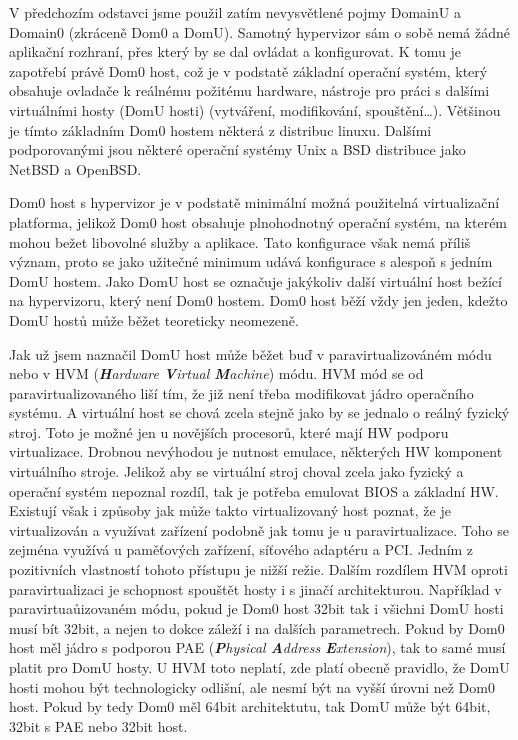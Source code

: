 V předchozím odstavci jsme použil zatím nevysvětlené pojmy DomainU a Domain0 (zkráceně Dom0 a DomU). Samotný \xen hypervizor sám o sobě nemá žádné aplikační rozhraní, přes který by se dal ovládat a konfigurovat. K tomu je zapotřebí právě Dom0 host, což je v podstatě základní operační systém, který obsahuje ovladače k reálnému požitému hardware, nástroje pro práci s dalšími virtuálními hosty (DomU hosti) (vytváření, modifikování, spouštění\dots). Většinou je tímto základním Dom0 hostem některá z distribuc linuxu. Dalšími podporovanými jsou některé operační systémy Unix a BSD distribuce jako NetBSD a OpenBSD.

Dom0 host s \xen hypervizor je v podstatě minimální možná použitelná virtualizační platforma, jelikož Dom0 host obsahuje plnohodnotný operační systém, na kterém mohou bežet libovolné služby a aplikace. Tato konfigurace však nemá příliš význam, proto se jako užitečné minimum udává konfigurace s alespoň s jedním DomU hostem. Jako DomU host se označuje jakýkoliv další virtuální host bežící na \xen hypervizoru, který není Dom0 hostem. Dom0 host běží vždy jen jeden, kdežto DomU hostů může běžet teoreticky neomezeně.

Jak už jsem naznačil DomU host může běžet buď v paravirtualizováném módu nebo v HVM (\emph{\textbf{H}ardware \textbf{V}irtual \textbf{M}achine}) módu. HVM mód se od paravirtualizovaného liší tím, že již není třeba modifikovat jádro operačního systému. A virtuální host se chová zcela stejně jako by se jednalo o reálný fyzický stroj. Toto je možné jen u novějších procesorů, které mají HW podporu virtualizace. Drobnou nevýhodou je nutnost emulace, některých HW komponent virtuálního stroje. Jelikož aby se virtuální stroj choval zcela jako fyzický a operační systém nepoznal rozdíl, tak je potřeba emulovat BIOS a základní HW. Existují však i způsoby jak může takto virtualizovaný host poznat, že je virtualizován a využívat zařízení podobně jak tomu je u paravirtualizace. Toho se zejména využívá u paměťových zařízení, síťového adaptéru a PCI. Jedním z pozitivních vlastností tohoto přístupu je nižší režie. Dalším rozdílem HVM oproti paravirtualizaci je schopnost spouštět hosty i s jinačí architekturou. Například v paravirtuaůizovaném módu, pokud je Dom0 host 32bit tak i všichni DomU hosti musí bít 32bit, a nejen to dokce záleží i na dalších parametrech. Pokud by Dom0 host měl jádro s podporou PAE (\emph{\textbf{P}hysical \textbf{A}ddress \textbf{E}xtension}), tak to samé musí platit pro DomU hosty. U HVM toto neplatí, zde platí obecně pravidlo, že DomU hosti mohou být technologicky odlišní, ale nesmí být na vyšší úrovni než Dom0 host. Pokud by tedy Dom0 měl 64bit architektutu, tak DomU může být 64bit, 32bit s PAE nebo 32bit host.

